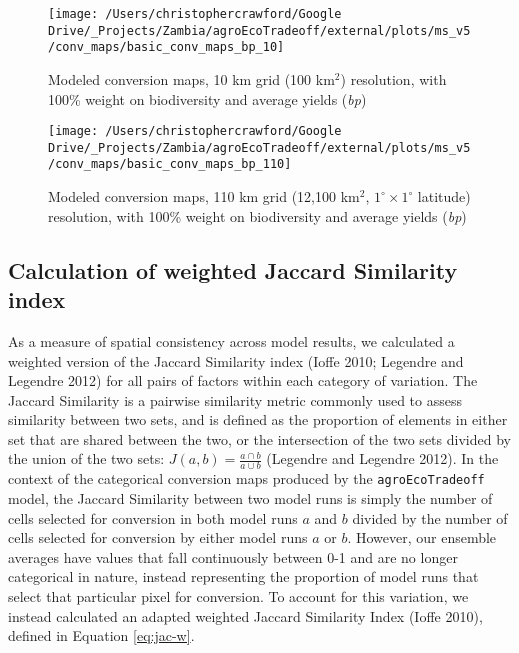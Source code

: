 \documentclass[
]{article}
\begin{document}
\begin{figure}
\texttt{[image: /Users/christophercrawford/Google Drive/\_Projects/Zambia/agroEcoTradeoff/external/plots/ms\_v5/conv\_maps/basic\_conv\_maps\_bp\_10]} \caption{Modeled conversion maps, 10 km grid (100 km\(^2\)) resolution, with 100\% weight on biodiversity and average yields (\emph{bp})}\label{fig:conv-maps-10-bp}
\end{figure}

\begin{figure}
\texttt{[image: /Users/christophercrawford/Google Drive/\_Projects/Zambia/agroEcoTradeoff/external/plots/ms\_v5/conv\_maps/basic\_conv\_maps\_bp\_110]} \caption{Modeled conversion maps, 110 km grid (12,100 km\(^2\), \(1^{\circ}\times1^{\circ}\) latitude) resolution, with 100\% weight on biodiversity and average yields (\emph{bp})}\label{fig:conv-maps-110-bp}
\end{figure}

\newpage

\hypertarget{calculation-of-weighted-jaccard-similarity-index}{%
\subsection{Calculation of weighted Jaccard Similarity index}\label{calculation-of-weighted-jaccard-similarity-index}}

As a measure of spatial consistency across model results, we calculated a weighted version of the Jaccard Similarity index (Ioffe 2010; Legendre and Legendre 2012) for all pairs of factors within each category of variation. The Jaccard Similarity is a pairwise similarity metric commonly used to assess similarity between two sets, and is defined as the proportion of elements in either set that are shared between the two, or the intersection of the two sets divided by the union of the two sets: \(J(a,b) = \frac{a\cap b}{a\cup b}\) (Legendre and Legendre 2012). In the context of the categorical conversion maps produced by the \texttt{agroEcoTradeoff} model, the Jaccard Similarity between two model runs is simply the number of cells selected for conversion in both model runs \(a\) and \(b\) divided by the number of cells selected for conversion by either model runs \(a\) or \(b\). However, our ensemble averages have values that fall continuously between 0-1 and are no longer categorical in nature, instead representing the proportion of model runs that select that particular pixel for conversion. To account for this variation, we instead calculated an adapted weighted Jaccard Similarity Index (Ioffe 2010), defined in Equation \eqref{eq:jac-w}.
\end{document}
